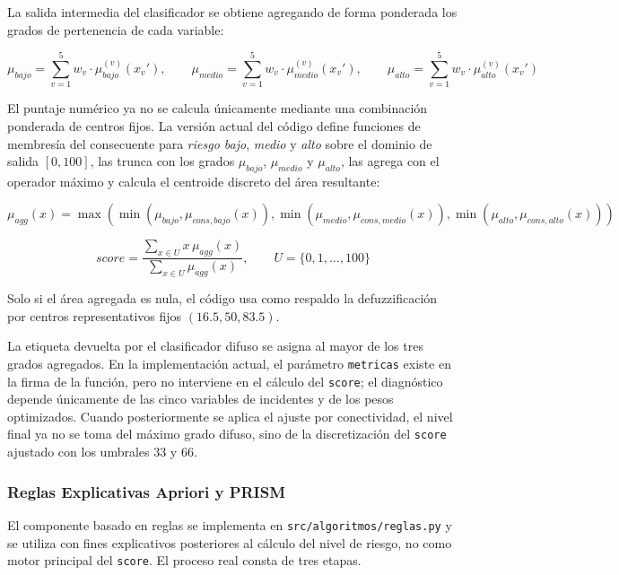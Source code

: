 \documentclass[11pt]{article}
\begin{document}
La salida intermedia del clasificador se obtiene agregando de forma ponderada los grados de pertenencia de cada variable:

\begin{equation}
    \mu_{bajo}  = \sum_{v=1}^{5} w_v \cdot \mu_{bajo}^{(v)}(x_v'), \qquad
    \mu_{medio} = \sum_{v=1}^{5} w_v \cdot \mu_{medio}^{(v)}(x_v'), \qquad
    \mu_{alto}  = \sum_{v=1}^{5} w_v \cdot \mu_{alto}^{(v)}(x_v')
\end{equation}

El puntaje numérico ya no se calcula únicamente mediante una combinación ponderada de centros fijos. La versión actual del código define funciones de membresía del consecuente para \textit{riesgo bajo}, \textit{medio} y \textit{alto} sobre el dominio de salida $[0,100]$, las trunca con los grados $\mu_{bajo}$, $\mu_{medio}$ y $\mu_{alto}$, las agrega con el operador máximo y calcula el centroide discreto del área resultante:

\begin{equation}
    \mu_{agg}(x) = \max \left(
    \min(\mu_{bajo}, \mu_{cons,bajo}(x)),
    \min(\mu_{medio}, \mu_{cons,medio}(x)),
    \min(\mu_{alto}, \mu_{cons,alto}(x))
    \right)
\end{equation}

\begin{equation}
    score = \frac{\sum_{x \in U} x \, \mu_{agg}(x)}{\sum_{x \in U} \mu_{agg}(x)},
    \qquad U = \{0,1,\dots,100\}
\end{equation}

Solo si el área agregada es nula, el código usa como respaldo la defuzzificación por centros representativos fijos $(16.5, 50, 83.5)$.

La etiqueta devuelta por el clasificador difuso se asigna al mayor de los tres grados agregados. En la implementación actual, el parámetro \texttt{metricas} existe en la firma de la función, pero no interviene en el cálculo del \texttt{score}; el diagnóstico depende únicamente de las cinco variables de incidentes y de los pesos optimizados. Cuando posteriormente se aplica el ajuste por conectividad, el nivel final ya no se toma del máximo grado difuso, sino de la discretización del \texttt{score} ajustado con los umbrales 33 y 66.

\subsubsection{Reglas Explicativas Apriori y PRISM}

El componente basado en reglas se implementa en \texttt{src/algoritmos/reglas.py} y se utiliza con fines explicativos posteriores al cálculo del nivel de riesgo, no como motor principal del \texttt{score}. El proceso real consta de tres etapas.
\end{document}
